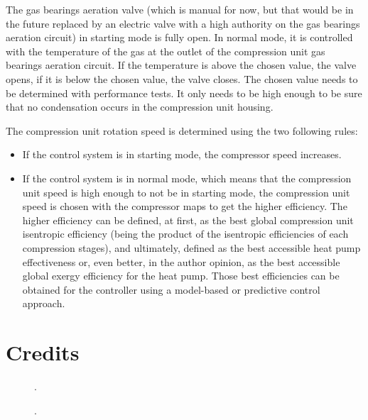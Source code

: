 The gas bearings aeration valve (which is manual for now, but that
would be in the future replaced by an electric valve with a high
authority on the gas bearings aeration circuit) in
starting mode is fully open. In normal mode, it is controlled with the
temperature of the gas at the outlet of the compression unit gas
bearings aeration circuit. If the temperature is above the chosen
value, the valve opens, if it is below the chosen value, the valve
closes. The chosen value needs to be determined with performance tests. It only needs to be high enough to be sure that no condensation
occurs in the compression unit housing.

The compression unit rotation speed is determined using the two following rules:

\begin{itemize}
\item If the control system is in starting mode, the compressor speed
  increases.
\item If the control system is in normal mode, which means that the
  compression unit speed is high enough to not be in starting mode,
  the compression unit speed is chosen with the compressor maps to get
  the higher efficiency. The higher efficiency can be defined, at
  first, as the best global compression unit isentropic efficiency
  (being the product of the isentropic efficiencies of each
  compression stages), and ultimately, defined as the best accessible
  heat pump effectiveness or, even better, in the author opinion, as
  the best accessible global exergy efficiency for the heat
  pump. Those best efficiencies can be
  obtained for the controller using a model-based or predictive
  control \citep{Fallahsohi-LinShi-2010a} approach.
\end{itemize}

\FloatBarrier


\label{sec:awp-refs}

\section*{Credits}
\label{sec:awp-credits}

\begin{description}
\item[] .
\item[] .
\end{description}

